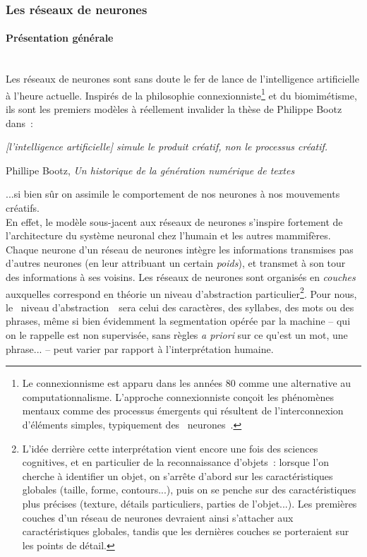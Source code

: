 \documentclass{article}
\newcommand{\subsubsubsection}[1]{\paragraph{#1}\mbox{}\\}
\newenvironment{citationbox}
{\begin{center}
		\begin{minipage}{.8\textwidth}
		}
		{
		\end{minipage}	
\end{center}
}
\begin{document}
			\subsubsection{Les réseaux de neurones}\label{neural_net}
				\subsubsubsection{Présentation générale}
					Les réseaux de neurones sont sans doute le fer de lance de l'intelligence artificielle à l'heure actuelle. Inspirés de la philosophie connexionniste\footnote{Le connexionnisme est apparu dans les années 80 comme une alternative au computationnalisme. L'approche connexionniste conçoit les phénomènes mentaux comme des processus émergents qui résultent de l'interconnexion d'éléments simples, typiquement des \guillemotleft~neurones~\guillemotright.} et du biomimétisme, ils sont les premiers modèles à réellement invalider la thèse de Philippe Bootz dans~:
					\begin{citationbox}
						\textit{[l'intelligence artificielle] simule le produit créatif, non le processus créatif.}
						\begin{flushright}
							Phillipe Bootz, \textit{Un historique de la génération numérique de textes} \autocite{bootz2006}
						\end{flushright}
					\end{citationbox}
					...si bien sûr on assimile le comportement de nos neurones à nos mouvements créatifs.\\
					En effet, le modèle sous-jacent aux réseaux de neurones s'inspire fortement de l'architecture du système neuronal chez l'humain et les autres mammifères. Chaque neurone d'un réseau de neurones intègre les informations transmises pas d'autres neurones (en leur attribuant un certain \textit{poids}), et transmet à son tour des informations à ses voisins. Les réseaux de neurones sont organisés en \textit{couches} auxquelles correspond en théorie un niveau d'abstraction particulier\footnote{L'idée derrière cette interprétation vient encore une fois des sciences cognitives, et en particulier de la reconnaissance d'objets~: lorsque l'on cherche à identifier un objet, on s'arrête d'abord sur les caractéristiques globales (taille, forme, contours...), puis on se penche sur des caractéristiques plus précises (texture, détails particuliers, parties de l'objet...). Les premières couches d'un réseau de neurones devraient ainsi s'attacher aux caractéristiques globales, tandis que les dernières couches se porteraient sur les points de détail.}. Pour nous, le \guillemotleft~niveau d'abstraction~\guillemotright~sera celui des caractères, des syllabes, des mots ou des phrases, même si bien évidemment la segmentation opérée par la machine -- qui on le rappelle est non supervisée, sans règles \textit{a priori} sur ce qu'est un mot, une phrase... -- peut varier par rapport à l'interprétation humaine.
\end{document}
